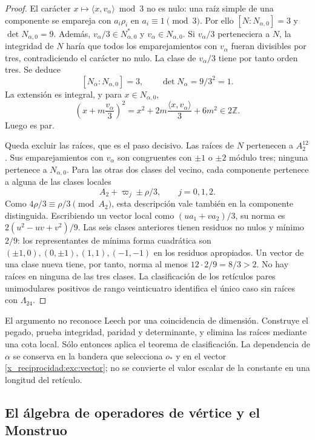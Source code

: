 \begin{proof}
El carácter $x\mapsto\langle x,v_\alpha\rangle\bmod3$ no es nulo:
una raíz simple de una componente se empareja con $a_i\rho_i$ en
$a_i\equiv1\pmod3$. Por ello $[N:N_{\alpha,0}]=3$ y
$\det N_{\alpha,0}=9$. Además,
$v_\alpha/3\in N_{\alpha,0}^*$ y $v_\alpha\in N_{\alpha,0}$.
Si $v_\alpha/3$ perteneciera a $N$, la integridad de $N$ haría que
todos los emparejamientos con $v_\alpha$ fueran divisibles por tres,
contradiciendo el carácter no nulo. La clase de $v_\alpha/3$ tiene
por tanto orden tres. Se deduce
\[
 [N_\alpha:N_{\alpha,0}]=3,
 \qquad \det N_\alpha=9/3^2=1.
\]
La extensión es integral, y para $x\in N_{\alpha,0}$,
\[
 \left(x+m\frac{v_\alpha}{3}\right)^2
   =x^2+2m\frac{\langle x,v_\alpha\rangle}{3}+6m^2
   \in2\mathbb Z.
\]
Luego es par.

Queda excluir las raíces, que es el paso decisivo. Las raíces de $N$
pertenecen a $A_2^{12}$. Sus emparejamientos con $v_\alpha$ son
congruentes con $\pm1$ o $\pm2$ módulo tres; ninguna pertenece a
$N_{\alpha,0}$. Para las otras dos clases del vecino, cada componente
pertenece a alguna de las clases locales
\[
 A_2+\varpi_j\pm\rho/3,\qquad j=0,1,2.
\]
Como $4\rho/3\equiv\rho/3\pmod{A_2}$, esta descripción vale
también en la componente distinguida. Escribiendo un vector local
como $(u a_1+v a_2)/3$, su norma es
$2(u^2-uv+v^2)/9$. Las seis clases anteriores tienen residuos no
nulos y mínimo $2/9$: los representantes de mínima forma cuadrática
son $(\pm1,0),(0,\pm1),(1,1),(-1,-1)$ en los residuos apropiados.
Un vector de una clase nueva tiene, por tanto, norma al menos
$12\cdot2/9=8/3>2$. No hay raíces en ninguna de las tres clases.
La clasificación de los retículos pares unimodulares positivos de
rango veinticuatro identifica el único caso sin raíces con
$\Lambda_{24}$.
\end{proof}

El argumento no reconoce Leech por una coincidencia de dimensión.
Construye el pegado, prueba integridad, paridad y determinante, y
elimina las raíces mediante una cota local. Sólo entonces aplica el
teorema de clasificación. La dependencia de $\alpha$ se conserva en
la bandera que selecciona $o_*$ y en el vector \eqref{x_reciprocidad:exc:vector};
no se convierte el valor escalar de la constante en una longitud del
retículo.

\subsection{El álgebra de operadores de vértice y el Monstruo}
\label{x_reciprocidad:exc:voa}

